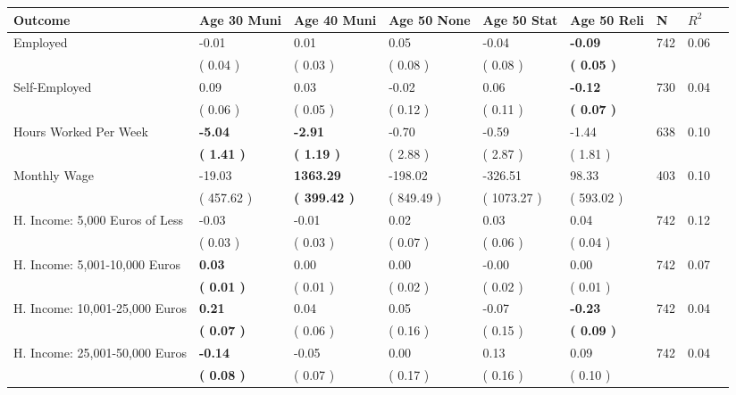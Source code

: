 \begin{tabular}{L{6.2cm} C{1.8cm} C{1.8cm} C{1.8cm} C{1.8cm} C{1.8cm} C{1.8cm} C{0.3cm} C{0.3cm}}
\toprule
 \textbf{Outcome} & \textbf{Age 30 Muni} & \textbf{Age 40 Muni} & \textbf{Age 50 None} & \textbf{Age 50 Stat} & \textbf{Age 50 Reli} & \textbf{N} & \textbf{$ R^2$} \\
\midrule
Employed &     -0.01 &      0.01 &      0.05 &     -0.04 & \textbf{    -0.09}  & 742 &       0.06 \\ 
 & (     0.04 ) & (     0.03 ) & (     0.08 ) & (     0.08 ) & \textbf{(     0.05 )}  & \\
Self-Employed &      0.09 &      0.03 &     -0.02 &      0.06 & \textbf{    -0.12}  & 730 &       0.04 \\ 
 & (     0.06 ) & (     0.05 ) & (     0.12 ) & (     0.11 ) & \textbf{(     0.07 )}  & \\
Hours Worked Per Week & \textbf{    -5.04} & \textbf{    -2.91} &     -0.70 &     -0.59 &     -1.44  & 638 &       0.10 \\ 
 & \textbf{(     1.41 )} & \textbf{(     1.19 )} & (     2.88 ) & (     2.87 ) & (     1.81 )  & \\
Monthly Wage &    -19.03 & \textbf{  1363.29} &   -198.02 &   -326.51 &     98.33  & 403 &       0.10 \\ 
 & (   457.62 ) & \textbf{(   399.42 )} & (   849.49 ) & (  1073.27 ) & (   593.02 )  & \\
H. Income: 5,000 Euros of Less &     -0.03 &     -0.01 &      0.02 &      0.03 &      0.04  & 742 &       0.12 \\ 
 & (     0.03 ) & (     0.03 ) & (     0.07 ) & (     0.06 ) & (     0.04 )  & \\
H. Income: 5,001-10,000 Euros & \textbf{     0.03} &      0.00 &      0.00 &     -0.00 &      0.00  & 742 &       0.07 \\ 
 & \textbf{(     0.01 )} & (     0.01 ) & (     0.02 ) & (     0.02 ) & (     0.01 )  & \\
H. Income: 10,001-25,000 Euros & \textbf{     0.21} &      0.04 &      0.05 &     -0.07 & \textbf{    -0.23}  & 742 &       0.04 \\ 
 & \textbf{(     0.07 )} & (     0.06 ) & (     0.16 ) & (     0.15 ) & \textbf{(     0.09 )}  & \\
H. Income: 25,001-50,000 Euros & \textbf{    -0.14} &     -0.05 &      0.00 &      0.13 &      0.09  & 742 &       0.04 \\ 
 & \textbf{(     0.08 )} & (     0.07 ) & (     0.17 ) & (     0.16 ) & (     0.10 )  & \\

\end{tabular}
